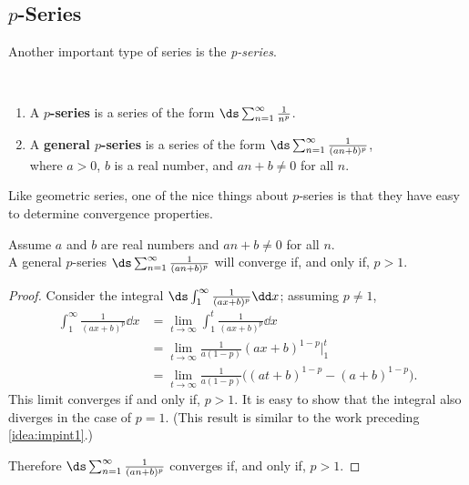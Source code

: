 \subsection{\texorpdfstring{$p$}{p}-Series}

Another important type of series is the \emph{p-series}.

\begin{definition}\label{def:pseries}%
\mbox{}\\[-2\baselineskip]\parbox[t]{\linewidth}{%
\begin{enumerate}
\item	A \textbf{$p$-series} is a series of the form
\qquad$\ds\sum_{n=1}^\infty \frac{1}{n^p}$.
\item	A \textbf{general $p$-series} is a series of the form 
\qquad$\ds\sum_{n=1}^\infty \frac{1}{(an+b)^p}$,\medskip\\
where $a>0$, $b$ is a real number, and $an+b\neq 0$ for all $n$.
\end{enumerate}}
\end{definition}

Like geometric series, one of the nice things about $p$-series is that they have easy to determine convergence properties.

\begin{theorem}\label{thm:pseries}%
Assume $a$ and $b$ are real numbers and  $an+b\neq 0$ for all $n$.\\
A general $p$-series $\ds\sum_{n=1}^\infty \frac{1}{(an+b)^p}$ will converge if, and only if, $p>1$.
\end{theorem}

\begin{proof}
Consider the integral $\ds\int_1^\infty \frac1{(ax+b)^p}\dd x$; assuming $p\neq 1$,
\begin{align*}
	\int_1^\infty \frac1{(ax+b)^p}\dd x
	&= \lim_{t\to\infty} \int_1^t \frac1{(ax+b)^p}\dd x \\
	&= \lim_{t\to\infty} \frac{1}{a(1-p)}(ax+b)^{1-p}\Big|_1^t\\
	&= \lim_{t\to\infty} \frac{1}{a(1-p)}\bigl((at+b)^{1-p}-(a+b)^{1-p}\bigr).
\end{align*}
This limit converges if and only if, $p>1$. It is easy to show that the integral also diverges in the case of $p=1$. (This result is similar to the work preceding \autoref{idea:impint1}.)

Therefore $\ds \sum_{n=1}^\infty \frac 1{(an+b)^p}$ converges if, and only if, $p>1$.
\end{proof}

